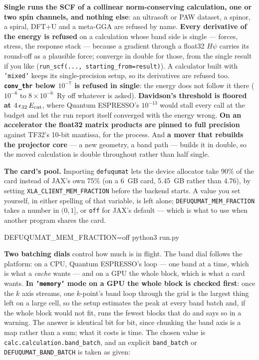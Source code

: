 \documentclass[11pt,a4paper]{article}
\newcommand{\qe}{Quantum ESPRESSO}
\newcommand{\code}[1]{\texttt{\small #1}}
\begin{document}
\begin{refuses}
\textbf{Single runs the SCF of a collinear norm-conserving calculation, one or two
spin channels, and nothing else}: an ultrasoft or PAW dataset, a spinor, a spiral,
DFT+U and a meta-GGA are refused by name. \textbf{Every derivative of the energy is
refused} on a calculation whose band side is single --- forces, stress, the
response stack --- because a gradient through a float32 $H\psi$ carries its
round-off as a plausible force; converge in double for those, from the single
result if you like (\code{run\_scf(..., starting\_from=result)}). A calculator built
with \code{'mixed'} keeps its single-precision setup, so its derivatives are refused
too. \textbf{\code{conv\_thr} below $10^{-7}$ is refused in single}: the energy does
not follow it there ($10^{-6}$ to $8\times10^{-6}$~Ry off whatever is asked).
\textbf{Davidson's threshold is floored at $4\,\epsilon_{32}\,E_{\rm cut}$}, where
\qe's $10^{-13}$ would stall every call at the budget and let the run report itself
converged with the energy wrong. \textbf{On an accelerator the float32 matrix
products are pinned to full precision} against TF32's 10-bit mantissa, for the
process. And \textbf{a mover that rebuilds the projector core} --- a new geometry,
a band path --- builds it in double, so the moved calculation is double throughout
rather than half single.
\end{refuses}

\textbf{The card's pool.} Importing \code{defuqumat} lets the device allocator take
90\% of the card instead of JAX's own 75\% (on a 6~GB card, 5.45~GB rather than
4.76), by setting \code{XLA\_CLIENT\_MEM\_FRACTION} before the backend starts.
A value you set yourself, in either spelling of that variable, is left alone;
\code{DEFUQUMAT\_MEM\_FRACTION} takes a number in $(0, 1]$, or \code{off} for
JAX's default --- which is what to use when another program shares the card.

\begin{shcode}
DEFUQUMAT_MEM_FRACTION=off python3 run.py
\end{shcode}

\textbf{Two batching dials} control how much is in flight. The band dial
follows the platform: on a CPU, \qe's loop --- one band at a time, which is what
a \emph{cache} wants --- and on a GPU the whole block, which is what a card
wants. \textbf{In \code{'memory'} mode on a GPU the whole block is checked
first}: once the $k$ axis streams, one $k$-point's band loop through the grid
is the largest thing left on a large cell, so the setup estimates the peak at
every band batch and, if the whole block would not fit, runs the fewest blocks
that do and says so in a warning. The answer is identical bit for bit, since
chunking the band axis is a map rather than a sum; what it costs is time. The
chosen value is \code{calc.calculation.band\_batch}, and an explicit
\code{band\_batch} or \code{DEFUQUMAT\_BAND\_BATCH} is taken as given:
\end{document}
